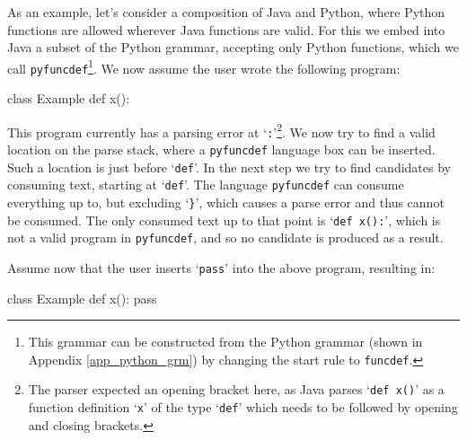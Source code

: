 \documentclass[sigplan,screen]{acmart}\settopmatter{printfolios=true,printccs=false,printacmref=false}
\newcommand{\qtt}[1]{`\texttt{#1}'\xspace}
\begin{document}
As an example, let's consider a composition of Java and Python, where Python
functions are allowed wherever Java functions are valid. For this we embed into
Java a subset of the Python grammar, accepting only Python functions, which we
call \texttt{pyfuncdef}\footnote{This grammar can be constructed from the
Python grammar (shown in Appendix \ref{app_python_grm}) by changing the start
rule to \texttt{funcdef}.}. We now assume the user wrote the following program:

\begin{lstdefault}[language=Java]
  class Example {
      def x():
  }
\end{lstdefault}
\vspace{1em}

This program currently has a parsing error at \qtt{:}\footnote{The parser
expected an opening bracket here, as Java parses \qtt{def x()} as a function
definition \qtt{x} of the type \qtt{def} which needs to be followed by opening
and closing brackets.}. We now try to find a valid location on the parse stack,
where a \texttt{pyfuncdef} language box can be inserted. Such a location is just
before \qtt{def}.
In the next step we try to find candidates by consuming text, starting at
\qtt{def}.  The language \texttt{pyfuncdef} can consume everything up to, but
excluding \qtt{\}}, which causes a parse error and thus cannot be consumed. The
only consumed text up to that point is \qtt{def x():}, which is not a valid
program in \texttt{pyfuncdef}, and so no candidate is produced as a result.

Assume now that the user inserts \qtt{pass} into the above program, resulting in:

\begin{minipage}{\linewidth}
\begin{lstdefault}[language=Java]
  class Example {
      def x():
          pass
  }
\end{lstdefault}
\end{minipage}
\vspace{1em}
\end{document}
